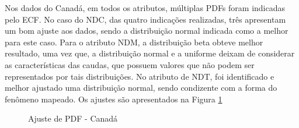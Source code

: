 \documentclass[a4paper,12pt]{article}
\begin{document}
\par Nos dados do Canadá, em todos os atributos, múltiplas PDFs foram indicadas pelo ECF. No caso do NDC, das quatro indicações realizadas, três apresentam um bom ajuste aos dados, sendo a distribuição normal indicada como a melhor para este caso. Para o atributo NDM, a distribuição beta obteve melhor resultado, uma vez que, a distribuição normal e a uniforme deixam de considerar as características das caudas, que possuem valores que não podem ser representados por tais distribuições. No atributo de NDT, foi identificado e melhor ajustado uma distribuição normal, sendo condizente com a forma do fenômeno mapeado. Os ajustes são apresentados na Figura \ref{figure:pdf2} 

\begin{figure}[H]
\captionsetup[subfigure]{labelformat=empty}
\caption{Ajuste de PDF - Canadá}
\qquad
{}
\qquad
\centering
{}
\label{figure:pdf2}
\end{figure}
\end{document}
